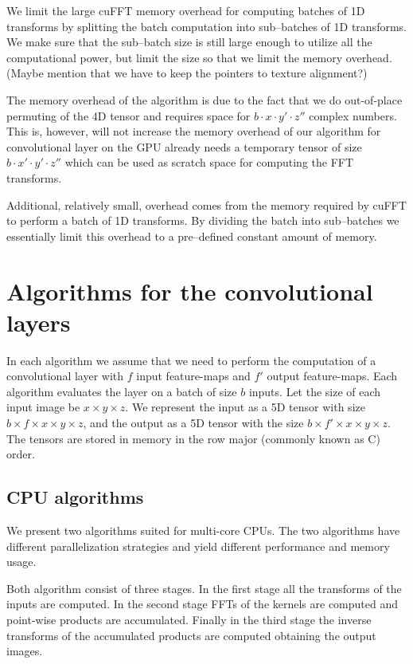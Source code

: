 \documentclass[conference]{IEEEtran}
\begin{document}
We limit the large cuFFT memory overhead for computing batches of 1D
transforms by splitting the batch computation into sub--batches of 1D
transforms.  We make sure that the sub--batch size is still large
enough to utilize all the computational power, but limit the size so
that we limit the memory overhead.  (Maybe mention that we have to
keep the pointers to texture alignment?)

The memory overhead of the algorithm is due to the fact that we do
out-of-place permuting of the 4D tensor and requires space for
$b \cdot x \cdot y' \cdot z''$ complex numbers.  This is, however,
will not increase the memory overhead of our algorithm for
convolutional layer on the GPU already needs a temporary tensor of
size $b \cdot x' \cdot y' \cdot z''$ which can be used as scratch
space for computing the FFT transforms.

Additional, relatively small, overhead comes from the memory required
by cuFFT to perform a batch of 1D transforms.  By dividing the batch
into sub--batches we essentially limit this overhead to a pre--defined
constant amount of memory.

\section{Algorithms for the convolutional layers}

In each algorithm we assume that we need to perform the computation of
a convolutional layer with $f$ input feature-maps and $f'$ output
feature-maps.  Each algorithm evaluates the layer on a batch of size
$b$ inputs.  Let the size of each input image be $x \times y \times
z$.  We represent the input as a 5D tensor with size $b \times
f \times x \times y \times z$, and the output as a 5D tensor with the
size $b \times f' \times x \times y \times z$.  The tensors are stored
in memory in the row major (commonly known as C) order.

\subsection{CPU algorithms}

We present two algorithms suited for multi-core CPUs.  The two
algorithms have different parallelization strategies and yield
different performance and memory usage.

Both algorithm consist of three stages.  In the first stage all the
transforms of the inputs are computed.  In the second stage FFTs of
the kernels are computed and point-wise products are accumulated.
Finally in the third stage the inverse transforms of the accumulated
products are computed obtaining the output images.
\end{document}
